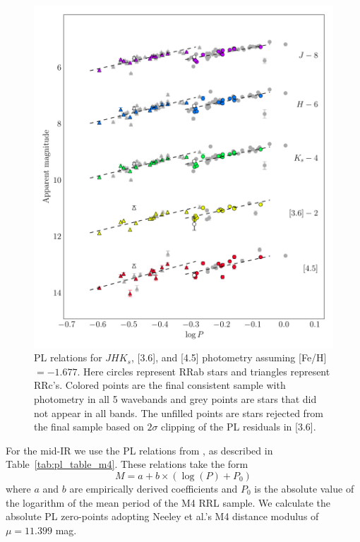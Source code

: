 \documentclass[a4paper,fleqn,usenatbib]{mnras}
\begin{document}
\begin{figure}
\begin{center}
\includegraphics[width=160mm]{reworked_fitting_code/final_plots/multiwavelength_PL_m4_clipped.pdf}
\caption{PL relations for $J\!H\!K_s$, [3.6], and [4.5] photometry assuming [Fe/H]$=-1.677$. Here circles represent RRab stars and triangles represent RRc's. Colored points are the final consistent sample with photometry in all 5 wavebands and grey points are stars that did not appear in all bands. The unfilled points are stars rejected from the final sample based on $2\sigma$ clipping of the PL residuals in [3.6].}
\label{fig:omegaCen_pl_m4}
\end{center}
\end{figure}

For the mid-IR we use the PL relations from \citet{2015ApJ...808...11N}, as described in Table~\ref{tab:pl_table_m4}. These relations take the form
\begin{equation}M = a + b \times (\log (P) + P_0) \end{equation}
where $a$ and $b$ are empirically derived coefficients and $P_0$ is the absolute value of the logarithm of the mean period of the M4 RRL sample. We calculate the absolute PL zero-points adopting Neeley et al.'s M4 distance modulus of $\mu=11.399$ mag.
\end{document}
